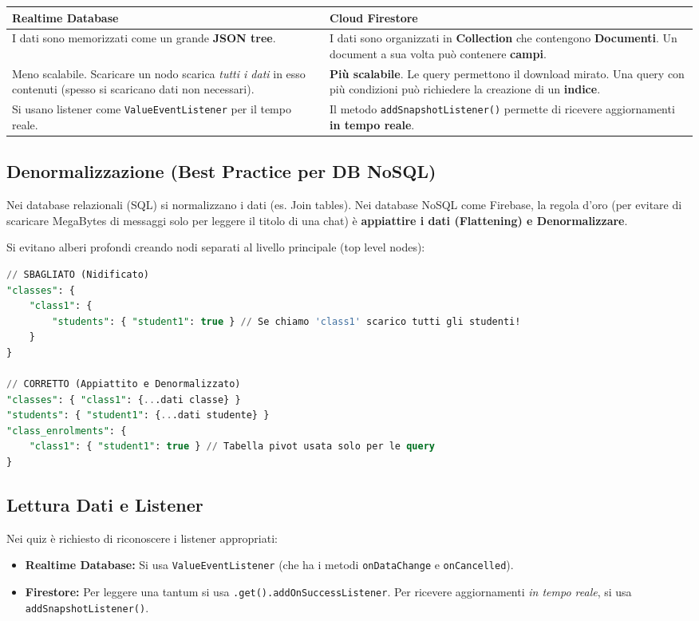 \begin{table}[h]
    \centering
    \begin{tabularx}{\textwidth}{|X|X|}
\hline
\rowcolor{gray!20} \textbf{Realtime Database} & \textbf{Cloud Firestore} \\ \hline
I dati sono memorizzati come un grande \textbf{JSON tree}. & I dati sono organizzati in \textbf{Collection} che contengono \textbf{Documenti}. Un document a sua volta può contenere \textbf{campi}. \\ \hline
Meno scalabile. Scaricare un nodo scarica \textit{tutti i dati} in esso contenuti (spesso si scaricano dati non necessari). & \textbf{Più scalabile}. Le query permettono il download mirato. Una query con più condizioni può richiedere la creazione di un \textbf{indice}. \\ \hline
Si usano listener come \texttt{ValueEventListener} per il tempo reale. & Il metodo \texttt{addSnapshotListener()} permette di ricevere aggiornamenti \textbf{in tempo reale}. \\ \hline
    \end{tabularx}
\end{table}

\subsection{Denormalizzazione (Best Practice per DB NoSQL)}
Nei database relazionali (SQL) si normalizzano i dati (es.
Join tables).
Nei database NoSQL come Firebase, la regola d'oro (per evitare di scaricare MegaBytes di messaggi solo per leggere il titolo
di una chat) è \textbf{appiattire i dati (Flattening) e Denormalizzare}.

Si evitano alberi profondi creando nodi separati al livello principale (top level nodes):
\begin{lstlisting}[language=SQL, caption={Antipattern vs Denormalizzazione}]
// SBAGLIATO (Nidificato)
"classes": {
    "class1": {
        "students": { "student1": true } // Se chiamo 'class1' scarico tutti gli studenti!
    }
}

// CORRETTO (Appiattito e Denormalizzato)
"classes": { "class1": {...dati classe} }
"students": { "student1": {...dati studente} }
"class_enrolments": {
    "class1": { "student1": true } // Tabella pivot usata solo per le query
}
\end{lstlisting}

\subsection{Lettura Dati e Listener}
Nei quiz è richiesto di riconoscere i listener appropriati:
\begin{itemize}
    \item \textbf{Realtime Database:} Si usa \texttt{ValueEventListener} (che ha i metodi \texttt{onDataChange} e \texttt{onCancelled}).
    \item \textbf{Firestore:} Per leggere una tantum si usa \texttt{.get().addOnSuccessListener}.
    Per ricevere aggiornamenti \textit{in tempo reale}, si usa \texttt{addSnapshotListener()}.
\end{itemize}

